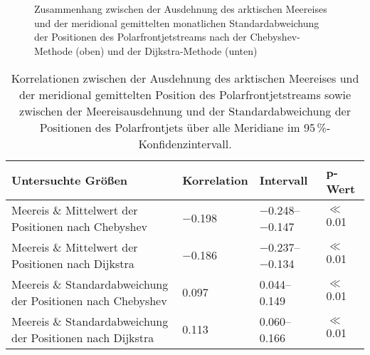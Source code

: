 \begin{figure} %
  \centering
  \begin{minipage}{\textwidth}
    \centering
  \end{minipage} \\ 
  \begin{minipage}{\textwidth}
    \centering
  \end{minipage} \\ 
  \caption[Korrelationen zwischen Ausdehnung des Meereises und Standardabweichung der Positionen des Polarfrontjets]{Zusammenhang zwischen der Ausdehnung des arktischen Meereises und der meridional gemittelten monatlichen Standardabweichung der Positionen des Polarfrontjetstreams nach der Chebyshev-Methode (oben) und der Dijkstra-Methode (unten)} \label{fig:korrelationen-seaice-sdev}
\end{figure}

\begin{table}[hbt] 
\caption[Korrelationen zwischen arktischem Meereis und mittlerem Polarfrontjet]{Korrelationen zwischen der Ausdehnung des arktischen Meereises und der meridional gemittelten Position des Polarfrontjetstreams sowie zwischen der Meereisausdehnung und der Standardabweichung der Positionen des Polarfrontjets über alle Meridiane im 95\,\%-Konfidenzintervall.} \label{tab:korrelationen-seeeis}
\begin{tabularx}{\textwidth}{|X|X|X|X|}
  \hline
  Untersuchte Größen & Korrelation & Intervall & p-Wert \\
  \hline \hline
  Meereis \& Mittelwert der Positionen nach Chebyshev & \num{-0.198} & \numrange[range-phrase = ;\,]{-0.248}{ -0.147} & $\ll$ \num{0.01} \\
  \hline
  Meereis \& Mittelwert der Positionen nach Dijkstra & \num{-0.186} & \numrange[range-phrase = ;\,]{-0.237}{ -0.134} & $\ll$ \num{0.01} \\
  \hline
  Meereis \& Standardabweichung der Positionen nach Chebyshev & \num{0.097} & \numrange[range-phrase = ;\,]{0.044}{ 0.149} & $\ll$ \num{0.01} \\
  \hline
  Meereis \& Standardabweichung der Positionen nach Dijkstra & \num{0.113} & \numrange[range-phrase = ;\,]{0.060}{ 0.166} & $\ll$ \num{0.01} \\
  \hline
\end{tabularx}
\end{table}
